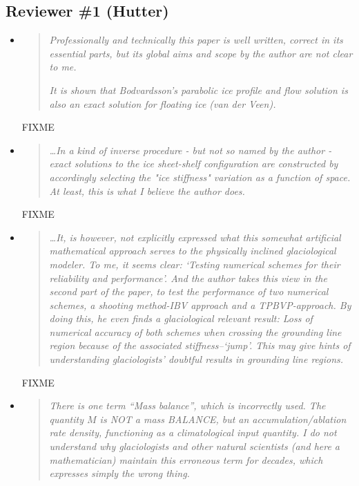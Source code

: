 \documentclass[11pt,reqno]{amsart}
\begin{document}
\subsection*{Reviewer \#1 (Hutter)}  \begin{itemize}
\item  \begin{quote}
\emph{Professionally and technically this paper is well written, correct in its essential parts, but its global aims and scope by the author are not clear to me.}

\medskip
\emph{It is shown that Bodvardsson's parabolic ice profile and flow solution is also an exact solution for floating ice (van der Veen).}
\end{quote}

\noindent FIXME

\item  \begin{quote}
\emph{\dots In a kind of inverse procedure - but not so named by the author - exact solutions to the ice sheet-shelf configuration are constructed by accordingly selecting the "ice stiffness" variation as a function of space. At least, this is what I believe the author does.}
\end{quote}

\noindent FIXME

\item  \begin{quote}
\emph{\dots It, is however, not explicitly expressed what this somewhat artificial mathematical approach serves to the physically inclined glaciological modeler. To me, it seems clear: `Testing numerical schemes for their reliability and performance'. And the author takes this view in the second part of the paper, to test the performance of two numerical schemes, a shooting method-IBV approach and a TPBVP-approach. By doing this, he even finds a glaciological relevant result: Loss of numerical accuracy of both schemes when crossing the grounding line region because of the associated stiffness--`jump'.  This may give hints of understanding glaciologists' doubtful results in grounding line regions.}
\end{quote}

\noindent FIXME

\item  \begin{quote}
\emph{There is one term ``Mass balance'', which is incorrectly used. The quantity $M$ is NOT a mass BALANCE, but an accumulation/ablation rate density, functioning as a climatological input quantity. I do not understand why glaciologists and other natural scientists (and here a mathematician) maintain this erroneous term for decades, which expresses simply the wrong thing.}
\end{quote}


\end{itemize}
\end{document}
